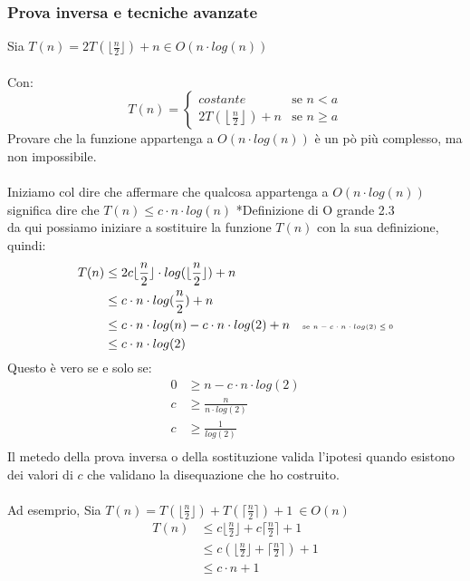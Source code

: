 \documentclass[a4paper,12pt]{article}
\begin{document}
\subsubsection{Prova inversa e tecniche avanzate}
Sia $T(n) = 2T(\lfloor \frac{n}{2} \rfloor) + n \in  O(n \cdot log(n))$ 
\\
\\
Con:
\[
T(n) = 
\begin{cases} 
    costante & \text{se } n < a \\ 
    2T\left(\left\lfloor \frac{n}{2} \right\rfloor\right) + n & \text{se } n \ge a
\end{cases}
\]
Provare che la funzione appartenga a $O(n \cdot log(n))$ è un pò più complesso, ma non impossibile. \\
\\
Iniziamo col dire che affermare che qualcosa appartenga a $O(n \cdot log(n)) $ significa dire che $ T(n) \le c \cdot n \cdot log(n)$ {\tiny{*Definizione di O grande 2.3}} \\
da qui possiamo iniziare a sostituire la funzione $T(n)$ con la sua definizione, quindi:
\begin{align*}
    T(n) &\le 2 c \lfloor \frac{n}{2} \rfloor \cdot log(\lfloor \frac{n}{2} \rfloor) + n \\
            &\le c \cdot n \cdot log(\frac{n}{2} ) + n \\
            &\le c \cdot n \cdot log(n) - c \cdot n  \cdot log(2) + n \quad  {\tiny{\text{se $n - c \cdot n \cdot log(2) \le 0$}}} \\
            &\le c \cdot n \cdot log(2)
\end{align*}
Questo è vero se e solo se:
\begin{align*}
    0 &\ge n - c \cdot n \cdot log(2) \\
    c &\ge \frac{n}{n \cdot log(2)} \\
    c &\ge \frac{1}{log(2)} \\
\end{align*}
Il metedo della prova inversa o della sostituzione valida l'ipotesi quando esistono dei valori di $c$ che validano la disequazione che ho costruito.\\
\\
Ad esemprio, Sia $T(n) = T(\lfloor \frac{n}{2} \rfloor ) + T(\lceil \frac{n}{2} \rceil) + 1 \: \in O(n)$ \\ 
\begin{align*}
    T(n) &\le c \lfloor \frac{n}{2} \rfloor + c \lceil \frac{n}{2} \rceil+ 1 \\
            &\le c( \lfloor \frac{n}{2} \rfloor + \lceil \frac{n}{2} \rceil) + 1 \\
            &\le c \cdot n + 1
\end{align*}
\end{document}
